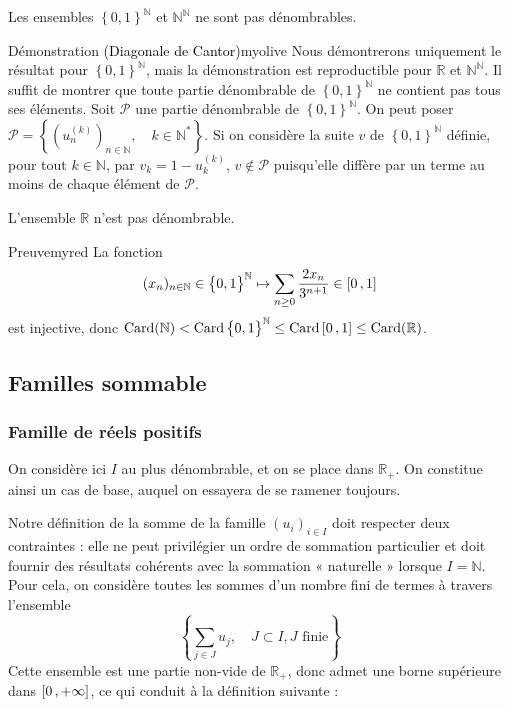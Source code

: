     \begin{prop}{}{}
        Les ensembles $\left\{0,1\right\}^{\mathbb{N}}$ et $\mathbb{N}^{\mathbb{N}}$ ne sont pas dénombrables.
    \end{prop}

    \begin{demo}{Démonstration \textcolor{black}{(Diagonale de Cantor)}}{myolive}
        Nous démontrerons uniquement le résultat pour $\left\{0,1\right\}^{\mathbb{N}}$, mais la démonstration est reproductible pour $\mathbb{R}$ et $\mathbb{N}^{\mathbb{N}}$. Il suffit de montrer que toute partie dénombrable de $\left\{0,1\right\}^{\mathbb{N}}$ ne contient pas tous ses éléments. Soit $\mathcal{P}$ une partie dénombrable de $\left\{0,1\right\}^{\mathbb{N}}$. On peut poser $\mathcal{P} = \left\{(u_n^{(k)})_{n \in \mathbb{N}}, \quad k \in \mathbb{N}^*\right\}$. Si on considère la suite $v$ de $\left\{0,1\right\}^{\mathbb{N}}$ définie, pour tout $k \in \mathbb{N}$, par $v_k = 1 - u_k^{(k)}$, $v \notin \mathcal{P}$ puisqu’elle diffère par un terme au moins de chaque élément de $\mathcal{P}$.
    \end{demo}

    \begin{theo}{}{}
        L’ensemble $\mathbb{R}$ n’est pas dénombrable.
    \end{theo}

    \begin{demo}{Preuve}{myred}
        La fonction 
        \[ (x_n)_{n \in \mathbb{N}} \in \big\{ 0,1 \big\}^{\mathbb{N}} \mapsto \sum_{n \geq 0} \frac{2 x_n}{3^{n+1}} \in \left[ 0 \, , 1 \right] \]   
        est injective, donc $\operatorname{Card}(\mathbb{N}) < \operatorname{Card}\big\{ 0,1 \big\}^{\mathbb{N}} \leq \operatorname{Card}\left[ 0 \, , 1 \right] \leq \operatorname{Card}(\mathbb{R})$.
    \end{demo}

\subsection{Familles sommable}

    \subsubsection{Famille de réels positifs}

    On considère ici $I$ au plus dénombrable, et on se place dans $\mathbb{R}_+$. On constitue ainsi un cas de base, auquel on essayera de se ramener toujours. 

    Notre définition de la somme de la famille $(u_i)_{i \in I}$ doit respecter deux contraintes : elle ne peut privilégier un ordre de sommation particulier et doit fournir des résultats cohérents avec la sommation « naturelle » lorsque $I = \mathbb{N}$. Pour cela, on considère toutes les sommes d’un nombre fini de termes à travers l’ensemble 
    \[ \left\{\sum_{j \in J} u_j, \quad J \subset I, J \text{ finie}\right\} \]
    Cette ensemble est une partie non-vide de $\mathbb{R}_+$, donc admet une borne supérieure dans $\left[ 0 \, , +\infty \right]$, ce qui conduit à la définition suivante :

